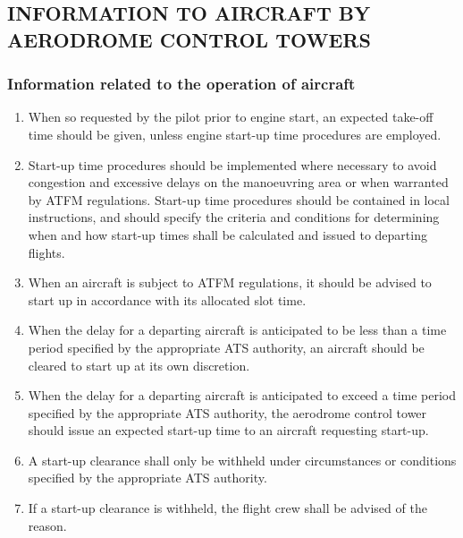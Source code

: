 \subsection[Information to aircraft by aerodrome control towers]{INFORMATION TO AIRCRAFT BY AERODROME CONTROL TOWERS}

\subsubsection{Information related to the operation of aircraft}


\begin{enumeratesc}
    \begin{enumerate}
        \item When so requested by the pilot prior to engine start, an expected take-off time should be given, unless engine start-up time procedures are employed.
        \item Start-up time procedures should be implemented where necessary to avoid congestion and excessive delays on the manoeuvring area or when warranted by ATFM regulations. Start-up time procedures should be contained in local instructions, and should specify the criteria and conditions for determining when and how start-up times shall be calculated and issued to departing flights.
        \item When an aircraft is subject to ATFM regulations, it should be advised to start up in accordance with its allocated slot time.
        \item When the delay for a departing aircraft is anticipated to be less than a time period specified by the appropriate ATS authority, an aircraft should be cleared to start up at its own discretion.
        \item When the delay for a departing aircraft is anticipated to exceed a time period specified by the appropriate ATS authority, the aerodrome control tower should issue an expected start-up time to an aircraft requesting start-up.
        \item A start-up clearance shall only be withheld under circumstances or conditions specified by the appropriate ATS authority.
        \item If a start-up clearance is withheld, the flight crew shall be advised of the reason.
    \end{enumerate}


\end{enumeratesc}
